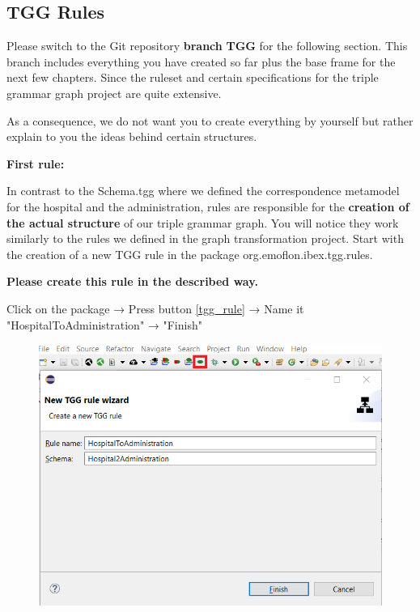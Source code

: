 \clearpage

\subsection{TGG Rules}

Please switch to the Git repository \textbf{branch} \textsf{\textbf{TGG}} for the following section. This branch includes everything you have created so far plus the base frame for the next few chapters. Since the ruleset and certain specifications for the triple grammar graph project are quite extensive.\newline

As a consequence, we do not want you to create everything by yourself but rather explain to you the ideas behind certain structures.\newline

\textbf{First rule:}

In contrast to the Schema.tgg where we defined the correspondence metamodel for the hospital and the administration, rules are responsible for the \textbf{creation of the actual structure} of our triple grammar graph. You will notice they work similarly to the rules we defined in the graph transformation project. Start with the creation of a new TGG rule in the package \textsf{org.emoflon.ibex.tgg.rules}.\newline

\textbf{Please create this rule in the described way.}\newline

\centering

Click on the package →  Press button \ref{tgg_rule} → Name it \textsf{"HospitalToAdministration"} → \textsf{"Finish"}\newline

\raggedright

\begin{figure}[h]
    \centering
    \includegraphics[scale=0.5 ]{pictures/tgg_rule_creation.png}
    \caption{}
    \label{TGG rule creation}
\end{figure}

